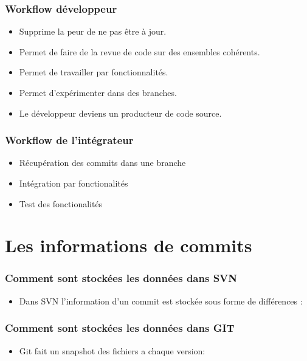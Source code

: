 \documentclass{beamer}
\begin{document}
    \begin{frame}
      \frametitle{Workflow développeur}
      \begin{itemize}
        \item Supprime la peur de ne pas être à jour.
        \item Permet de faire de la revue de code sur des ensembles cohérents.
        \item Permet de travailler par fonctionnalités.
        \item Permet d'expérimenter dans des branches.
        \item Le développeur deviens un producteur de code source.
      \end{itemize}
    \end{frame}

    \begin{frame}
      \frametitle{Workflow de l'intégrateur}
      \begin{itemize}
        \item Récupération des commits dans une branche
        \item Intégration par fonctionalités
        \item Test des fonctionalités
      \end{itemize}
    \end{frame}
    \section{Les informations de commits}

    \begin{frame}
      \frametitle{Comment sont stockées les données dans SVN}
      \begin{itemize}
        \item Dans SVN l'information d'un commit est stockée sous forme de différences :
      \end{itemize}
    \end{frame}

   \begin{frame}
      \frametitle{Comment sont stockées les données dans GIT}
      \begin{itemize}
        \item Git fait un snapshot des fichiers a chaque version:
      \end{itemize}
    \end{frame}
\end{document}
